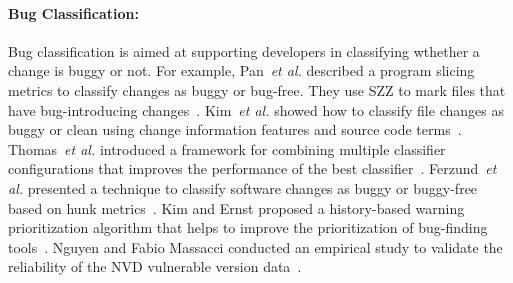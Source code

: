 \documentclass[a4paper, 12pt]{book}
\begin{document}

\paragraph{Bug Classification:} Bug classification is aimed at supporting developers in classifying wthether a change is buggy or not. For example, Pan~\textit{et al.} described a program slicing metrics to classify changes as buggy or bug-free. They use SZZ to mark files that have bug-introducing changes~\cite{pan2006bug}. Kim~\textit{et al.} showed how to classify file changes as buggy or clean using change information features and source code terms~\cite{kim2008classifying}. Thomas~\textit{et al.} introduced a framework for combining multiple classifier configurations that improves the performance of the best classifier~\cite{thomas2013impact}. Ferzund~\textit{et al.} presented a technique to classify software changes as buggy or buggy-free based on hunk metrics~\cite{ferzund2009software}. Kim and Ernst proposed a history-based warning prioritization algorithm that helps to improve the prioritization of bug-finding tools~\cite{kim2007warnings}. Nguyen and Fabio Massacci conducted an empirical study to validate the reliability of the NVD vulnerable version data~\cite{nguyen2013reliability}.
\end{document}
